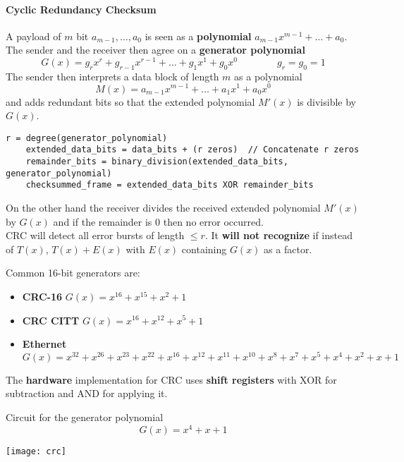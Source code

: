\paragraph{Cyclic Redundancy Checksum}
A payload of $m$ bit $a_{m-1}, \ldots, a_0$ is seen as a \textbf{polynomial} $a_{m-1}x^{m-1} + \ldots + a_0$. The sender and the receiver then agree on a \textbf{generator polynomial}
\begin{equation*}
	G(x) = g_r x^r + g_{r-1} x^{r-1} + \ldots + g_1 x^1 + g_0 x^0 \qquad\qquad g_r = g_0 = 1
\end{equation*}
The sender then interprets a data block of length $m$ as a polynomial 
\begin{equation*}
	M(x) = a_{m-1}x^{m-1} + \ldots + a_1x^1 + a_0x^0
\end{equation*}
and adds redundant bits so that the extended polynomial $M'(x)$ is divisible by $G(x)$.
\begin{lstlisting}[mathescape=true]
	r = degree(generator_polynomial)
	extended_data_bits = data_bits + (r zeros)  // Concatenate r zeros
	remainder_bits = binary_division(extended_data_bits, generator_polynomial)
	checksummed_frame = extended_data_bits XOR remainder_bits
\end{lstlisting}
On the other hand the receiver divides the received extended polynomial $M'(x)$ by $G(x)$ and if the remainder is $0$ then no error occurred.\\
CRC will detect all error bursts of length $\leq r$. It \textbf{will not recognize} if instead of $T(x)$, $T(x)+E(x)$ with $E(x)$ containing $G(x)$ as a factor.
\begin{note}
	Common 16-bit generators are:
	\begin{itemize}
		\item \textbf{CRC-16} $G(x) = x^{16} + x^{15} + x^2 +1$
		\item \textbf{CRC CITT} $G(x) = x^{16} + x^{12} + x^5 + 1$
		\item \textbf{Ethernet} $G(x) = x^32 + x^{26} + x^{23} + x^{22} + x^{16} + x^{12} + x^{11} + x^{10} + x^8 + x^7 + x^5 + x^4 +x^2 + x+1$
	\end{itemize}
\end{note}
The \textbf{hardware} implementation for CRC uses \textbf{shift registers} with XOR for subtraction and AND for applying it.
\begin{example}
	Circuit for the generator polynomial
	\begin{equation*}
		G(x) = x^4 + x + 1
	\end{equation*}
	\begin{center}
		\texttt{[image: crc]}
	\end{center}
\end{example}

